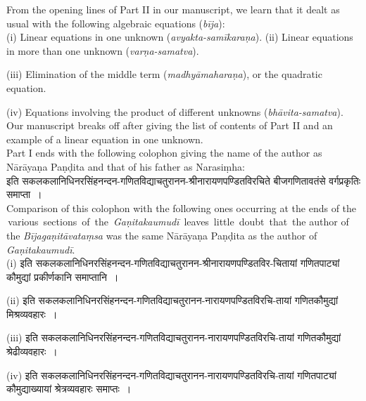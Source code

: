 \documentclass[11pt, openany]{book}
\begin{document}
From the opening lines of Part II in our manuscript, we learn that it dealt as usual with the following algebraic equations (\textit{bīja}):\\

(i) Linear equations in one unknown (\textit{avyakta-samīkaraṇa}).
\newpage
(ii) Linear equations in more than one unknown (\textit{varṇa-samatva}).
\vspace{2mm}

(iii) Elimination of the middle term (\textit{madhyāmaharaṇa}), or the quadratic equation.
\vspace{2mm}

(iv) Equations \;involving \;the \;product \;of \;different \;unknowns (\textit{bhāvita-samatva}).\\

\noindent Our manuscript breaks off after giving the list of contents of Part II and an example of a linear equation in one unknown.\\

Part I ends with the following colophon giving the name of the author as Nārāyaṇa Paṇḍita and that of his father as Narasiṃha:\\

इति सकलकलानिधिनरसिंहनन्दन-गणितविद्याचतुरानन-श्रीनारायणपण्डितविरचिते
बीजगणितावतंसे वर्गप्रकृतिः समाप्ता~। \\

Comparison of this colophon with the following ones occurring at the ends of the \,various \,sections \,of \,the \,\textit{Gaṇitakaumudī} \,leaves \,little \,doubt \,that \,the author of the \textit{Bījagaṇitāvataṃsa} was the same Nārāyaṇa Paṇḍita as the author of \textit{Gaṇitakaumudī}.\\

(i) इति सकलकलानिधिनरसिंहनन्दन-गणितविद्याचतुरानन-श्रीनारायणपण्डितविर-चितायां गणितपाट्यां कौमुद्यां प्रकीर्णकानि समाप्तानि~।
\vspace{2mm}

(ii) इति सकलकलानिधिनरसिंहनन्दन-गणितविद्याचतुरानन-नारायणपण्डितविरचि-तायां गणितकौमुद्यां मिश्रव्यवहारः~।
\vspace{2mm}

(iii) इति सकलकलानिधिनरसिंहनन्दन-गणितविद्याचतुरानन-नारायणपण्डितविरचि-तायां गणितकौमुद्यां श्रेढीव्यवहारः~।
\vspace{2mm}

(iv) इति सकलकलानिधिनरसिंहनन्दन-गणितविद्याचतुरानन-नारायणपण्डितविरचि-तायां गणितपाट्यां कौमुद्याख्यायां श्रेत्रव्यवहारः समाप्तः~।
\vspace{2mm}
\end{document}
